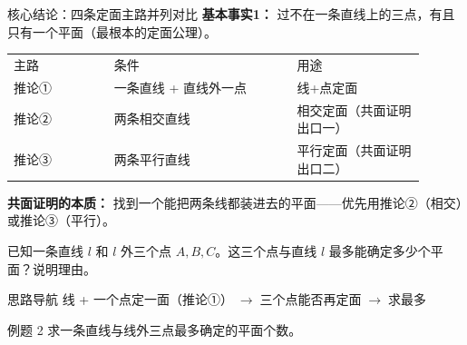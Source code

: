 \documentclass{exam-zh}
\begin{document}
\begin{eduSolutionBox}{核心结论：四条定面主路并列对比}
  \begingroup
  \setlength{\parskip}{2.5mm}
\textbf{基本事实1：} 过不在一条直线上的三点，有且只有一个平面（最根本的定面公理）。\par
\begin{tabular}{p{0.22\linewidth}p{0.40\linewidth}p{0.28\linewidth}}
主路 & 条件 & 用途\\
推论① & 一条直线 + 直线外一点 & 线+点定面\\
推论② & 两条相交直线 & 相交定面（共面证明出口一）\\
推论③ & 两条平行直线 & 平行定面（共面证明出口二）\\
\end{tabular}
\par
\textbf{共面证明的本质：} 找到一个能把两条线都装进去的平面——优先用推论②（相交）或推论③（平行）。\par
  \endgroup
\end{eduSolutionBox}




\begin{eduProblemBlock}[例题 2]
已知一条直线 $l$ 和 $l$ 外三个点 $A,B,C$。这三个点与直线 $l$
最多能确定多少个平面？说明理由。

\end{eduProblemBlock}





\begin{eduAuxItem}{思路导航}
线 + 一个点定一面（推论①）$\;\to\;$三个点能否再定面$\;\to\;$求最多\end{eduAuxItem}




\begin{eduSubQuestionItem}{例题 2}
求一条直线与线外三点最多确定的平面个数。\end{eduSubQuestionItem}
\end{document}
